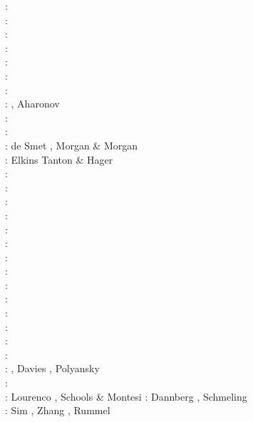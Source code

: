 \begin{scriptsize}
\nineteeneightyfour: \cite{scst84}\cite{mcke84}\\
\nineteeneightysix: \cite{scst86}\\
\nineteeneightyseven: \cite{hayu87}\cite{spmc87}\\
\nineteeneightyeight: \cite{scot88}\\
\nineteenninety: \cite{hayu90}\\
\nineteenninetythree: \cite{spie93}\cite{tast93}\\
\nineteenninetyfour: \cite{jhpp94}\cite{sawy94}\\
\nineteenninetyfive: \cite{bisc95}\cite{crks95}, Aharonov \etal \cite{ahwk95}\\
\nineteenninetysix: \cite{laki96}\\
\nineteenninetyeight: \cite{rabg98}\\
\nineteenninetynine: de Smet \etal \cite{devv99}, Morgan \& Morgan \cite{momo99}\\ 
\twothousand: Elkins Tanton \& Hager \cite{elha00}\\
\twothousandone: \cite{bers01}\\
\twothousandtwo: \cite{sobo02}\\
\twothousandthree: \cite{beri03}\\
\twothousandfive: \cite{onml05}\\
\twothousandsix: \cite{onmm06}\\
\twothousandseven: \cite{srrb07}\cite{mohb07}\cite{elki07}\cite{copb07}\\
\twothousandeight: \cite{hets08}\cite{hest08}\\
\twothousandnine: \cite{bavi09}\\
\twothousandten: \cite{baiv10}\cite{habl10}\cite{cows10}\cite{dekc10}\\
\twothousandeleven: \cite{baiv11}\cite{zhgy11}\cite{zhgh11}\cite{bics11}\cite{mobh11}\\
\twothousandtwelve: \cite{yatd12}\cite{kasc12b}\cite{ullc12}\\
\twothousandthirteen: \cite{kemk13}\cite{mofm13}\cite{mowe13}\\
\twothousandfourteen: \cite{kast14}\\
\twothousandfifteen: \cite{tukb15}\cite{moba15}\cite{rerl15}\cite{riag15}\cite{rey15}\cite{yadm15}\\
\twothousandsixteen: \cite{keka16}\cite{vade16}\cite{mesj16}, Davies \etal \cite{dalg16},
                     Polyansky \etal \cite{porb16} \\
\twothousandseventeen: \cite{dilc17}\\
\twothousandeighteen: Lourenco \etal \cite{lorg18}, Schools \& Montesi \cite{scmo18}
\twothousandnineteen: Dannberg \etal \cite{dagg19}, Schmeling \etal \cite{scmw19}\\
\twothousandtwenty: Sim \etal \cite{siss20}, Zhang \etal \cite{zhbp20}, Rummel \etal \cite{rubk20}
\end{scriptsize}


